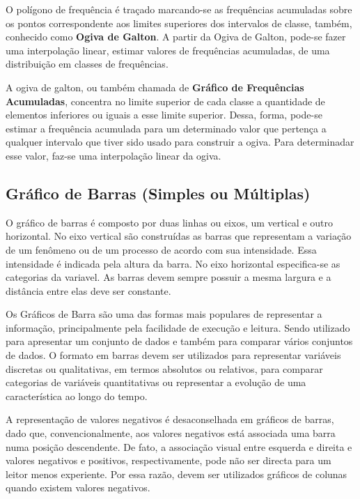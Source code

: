 O polígono de frequência é traçado marcando-se as frequências
acumuladas sobre os pontos correspondente aos limites superiores
dos intervalos de classe, também, conhecido como \textbf{Ogiva de
Galton}. A partir da Ogiva de Galton, pode-se fazer uma
interpolação linear, estimar valores de frequências acumuladas, de
uma distribuição em classes de frequências.\vskip0.3cm

A ogiva de galton, ou também chamada de \textbf{Gráfico de
Frequências Acumuladas}, concentra no limite superior de cada
classe a quantidade de elementos inferiores ou iguais a esse
limite superior. Dessa, forma, pode-se estimar a frequência
acumulada para um determinado valor que pertença a qualquer
intervalo que tiver sido usado para construir a ogiva. Para
determinadar esse valor, faz-se uma interpolação linear da ogiva.


\subsection{Gráfico de Barras (Simples ou Múltiplas)}

\inic O gráfico de barras é composto por duas linhas ou eixos, um
vertical e outro horizontal. No eixo vertical são construídas as
barras que representam a variação de um fenômeno ou de um processo
de acordo com sua intensidade. Essa intensidade é indicada pela
altura da barra. No eixo horizontal especifica-se as categorias da
variavel. As barras devem sempre possuir a mesma largura e a
distância entre elas deve ser constante.\vskip0.3cm

Os Gráficos de Barra são uma das formas mais populares de representar a informação, principalmente pela facilidade de execução e leitura. Sendo utilizado para apresentar um conjunto de dados e também para comparar vários conjuntos de dados. O formato em barras devem ser utilizados para representar variáveis discretas ou qualitativas, em termos absolutos ou relativos, para comparar categorias de variáveis quantitativas ou representar a evolução de uma característica ao longo do tempo.\vskip0.3cm

A representação de valores negativos é desaconselhada em gráficos de barras, dado que, convencionalmente, aos valores negativos está associada uma barra numa posição descendente. De fato, a associação visual entre esquerda e direita e valores negativos e positivos, respectivamente, pode não ser directa para um leitor menos experiente. Por essa razão, devem ser utilizados gráficos de colunas quando existem valores negativos.\vskip0.3cm

